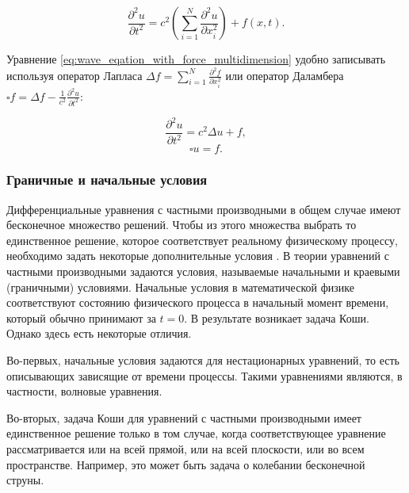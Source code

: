 \documentclass[12pt,a4paper,russian]{report}
\begin{document}
	\begin{equation} \label{eq:wave_eqation_with_force_multidimension}
		\frac{\partial^2 u}{\partial t^2} = c^2 \left(  \sum_{i=1}^{N} \frac{\partial^2 u}{\partial x_i^2} \right) + f(x, t).
	\end{equation}
	
	Уравнение \eqref{eq:wave_eqation_with_force_multidimension} удобно записывать используя оператор Лапласа $ \displaystyle \Delta f = \sum_{i=1}^{N} \frac{\partial^2 f}{\partial x_i^2} $ или оператор Даламбера $ \displaystyle \square f = \Delta f - \frac{1}{c^2} \frac{\partial^2 u}{\partial t^2}$:
	
	\begin{equation*}
		\frac{\partial^2 u}{\partial t^2} = c^2 \Delta u + f ,
	\end{equation*}
	\begin{equation*}
		\square u = f.
	\end{equation*}
		
	
	\subsubsection{Граничные и начальные условия}
	
	
	Дифференциальные уравнения с частными производными в общем случае имеют бесконечное множество решений. Чтобы из этого множества выбрать то единственное решение, которое соответствует реальному физическому процессу, необходимо задать некоторые дополнительные условия \cite{Tihonov_Urmatfiz}. В теории уравнений с частными производными задаются условия, называемые начальными и краевыми (граничными) условиями. Начальные условия в математической физике соответствуют состоянию физического процесса в начальный момент времени, который обычно принимают за $t=0$. В результате возникает задача Коши. Однако здесь есть некоторые отличия. 
	
	Во-первых, начальные условия задаются для нестационарных уравнений, то есть описывающих зависящие от времени процессы. Такими уравнениями являются, в частности, волновые уравнения. 
	
	Во-вторых, задача Коши для уравнений с частными производными имеет единственное решение только в том случае, когда соответствующее уравнение рассматривается или на всей прямой, или на всей плоскости, или во всем пространстве. Например, это может быть задача о колебании бесконечной струны. 
	
\end{document}
